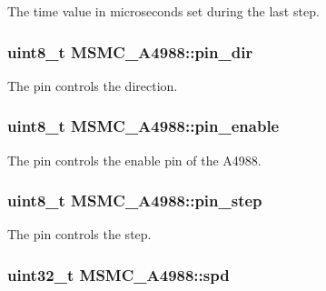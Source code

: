 The time value in microseconds set during the last step. 

\hypertarget{class_m_s_m_c___a4988_a2bc9676a272bcd6604aaf8b08ac07109}{
\subsubsection[{pin\+\_\+dir}]{\setlength{\rightskip}{0pt plus 5cm}uint8\+\_\+t M\+S\+M\+C\+\_\+\+A4988\+::pin\+\_\+dir\hspace{0.3cm}{\ttfamily [private]}}}\label{class_m_s_m_c___a4988_a2bc9676a272bcd6604aaf8b08ac07109}


The pin controls the direction. 

\hypertarget{class_m_s_m_c___a4988_a822c3db98367f3e60347a13d1d16170b}{
\subsubsection[{pin\+\_\+enable}]{\setlength{\rightskip}{0pt plus 5cm}uint8\+\_\+t M\+S\+M\+C\+\_\+\+A4988\+::pin\+\_\+enable\hspace{0.3cm}{\ttfamily [private]}}}\label{class_m_s_m_c___a4988_a822c3db98367f3e60347a13d1d16170b}


The pin controls the enable pin of the A4988. 

\hypertarget{class_m_s_m_c___a4988_a2ea61398ce88d1ee627b409a5965b478}{
\subsubsection[{pin\+\_\+step}]{\setlength{\rightskip}{0pt plus 5cm}uint8\+\_\+t M\+S\+M\+C\+\_\+\+A4988\+::pin\+\_\+step\hspace{0.3cm}{\ttfamily [private]}}}\label{class_m_s_m_c___a4988_a2ea61398ce88d1ee627b409a5965b478}


The pin controls the step. 

\hypertarget{class_m_s_m_c___a4988_a6453efb52d22739962c05b0d03f65aa7}{
\subsubsection[{spd}]{\setlength{\rightskip}{0pt plus 5cm}uint32\+\_\+t M\+S\+M\+C\+\_\+\+A4988\+::spd\hspace{0.3cm}{\ttfamily [private]}}}\label{class_m_s_m_c___a4988_a6453efb52d22739962c05b0d03f65aa7}


